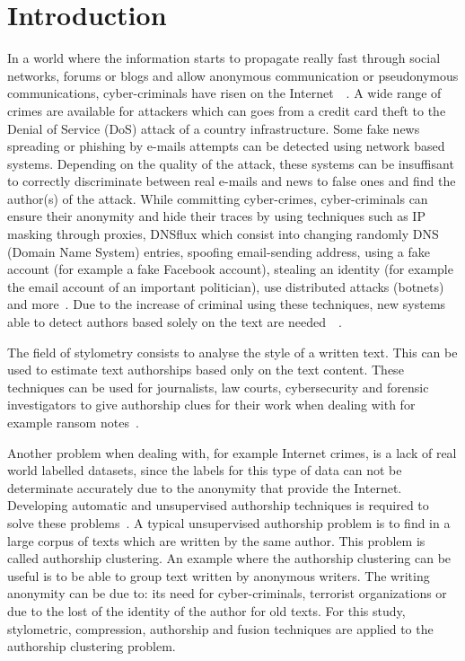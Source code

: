 
\section{Introduction \label{sec:introduction}}

In a world where the information starts to propagate really fast through social networks, forums or blogs and allow anonymous communication or pseudonymous communications, cyber-criminals have risen on the Internet~\cite{automated_unsupervised}~\cite{kocher_pan16}.
A wide range of crimes are available for attackers which can goes from a credit card theft to the Denial of Service (DoS) attack of a country infrastructure.
Some fake news spreading or phishing by e-mails attempts can be detected using network based systems.
Depending on the quality of the attack, these systems can be insuffisant to correctly discriminate between real e-mails and news to false ones and find the author(s) of the attack.
While committing cyber-crimes, cyber-criminals can ensure their anonymity and hide their traces by using techniques such as IP masking through proxies, DNSflux which consist into changing randomly DNS (Domain Name System) entries, spoofing email-sending address, using a fake account (for example a fake Facebook account), stealing an identity (for example the email account of an important politician), use distributed attacks (botnets) and more~\cite{attribution_in_cyberspace}.
Due to the increase of criminal using these techniques, new systems able to detect authors based solely on the text are needed~\cite{automated_unsupervised}~\cite{unine_pan20_fake_news}.

The field of stylometry consists to analyse the style of a written text.
This can be used to estimate text authorships based only on the text content.
These techniques can be used for journalists, law courts, cybersecurity and forensic investigators to give authorship clues for their work when dealing with for example ransom notes~\cite{pan16_clustering_site}.

Another problem when dealing with, for example Internet crimes, is a lack of real world labelled datasets, since the labels for this type of data can not be determinate accurately due to the anonymity that provide the Internet.
Developing automatic and unsupervised authorship techniques is required to solve these problems~\cite{automated_unsupervised}.
A typical unsupervised authorship problem is to find in a large corpus of texts which are written by the same author.
This problem is called authorship clustering.
An example where the authorship clustering can be useful is to be able to group text written by anonymous writers.
The writing anonymity can be due to: its need for cyber-criminals, terrorist organizations or due to the lost of the identity of the author for old texts.
For this study, stylometric, compression, authorship and fusion techniques are applied to the authorship clustering problem.

